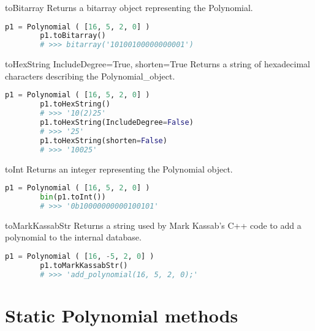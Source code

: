  {toBitarray} {} {
	Returns a bitarray object representing the Polynomial.
}
\begin{lstlisting}[language=Python]
		p1 = Polynomial ( [16, 5, 2, 0] )
		p1.toBitarray()
		# >>> bitarray('10100100000000001')
\end{lstlisting}

 {toHexString} {IncludeDegree=True, shorten=True} {
	Returns a string of hexadecimal characters describing the Polynomial\_object.
}
\begin{lstlisting}[language=Python]
		p1 = Polynomial ( [16, 5, 2, 0] )
		p1.toHexString()
		# >>> '10(2)25'
		p1.toHexString(IncludeDegree=False)
		# >>> '25'
		p1.toHexString(shorten=False)
		# >>> '10025'
\end{lstlisting}

 {toInt} {} {
	Returns an integer representing the Polynomial object.
}
\begin{lstlisting}[language=Python]
		p1 = Polynomial ( [16, 5, 2, 0] )
		bin(p1.toInt())
		# >>> '0b10000000000100101'
\end{lstlisting}

 {toMarkKassabStr} {} {
	Returns a string used by Mark Kassab's C++ code to add a polynomial to the internal database.
}
\begin{lstlisting}[language=Python]
		p1 = Polynomial ( [16, -5, 2, 0] )
		p1.toMarkKassabStr()
		# >>> 'add_polynomial(16, 5, 2, 0);'
\end{lstlisting}

\section{Static Polynomial methods}